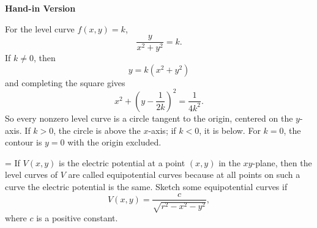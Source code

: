 \documentclass[a4paper,12pt,twocolumn]{article}
\newlength{\problemnumberwidth}
\newenvironment{solutionbox}{\begin{framed}}{\end{framed}}
\newcommand{\problem}[3]{%
  \Needspace{10\baselineskip}%
  \phantomsection\label{#1}%
  \par\vspace{0.8em}%
  \noindent
  \hangindent=\problemnumberwidth
  \hangafter=1
  \makebox[\problemnumberwidth][l]{\textbf{#2.}}#3\par
}
\begin{document}
\begin{solutionbox}
\textbf{Hand-in Version}

For the level curve \(f(x,y)=k\),
\[
\frac{y}{x^2+y^2}=k.
\]
If \(k\ne 0\), then
\[
y=k(x^2+y^2)
\]
and completing the square gives
\[
\boxed{x^2+\left(y-\frac{1}{2k}\right)^2=\frac{1}{4k^2}.}
\]
So every nonzero level curve is a circle tangent to the origin, centered on the \(y\)-axis. If \(k>0\), the circle is above the \(x\)-axis; if \(k<0\), it is below. For \(k=0\), the contour is \(y=0\) with the origin excluded.

\begin{center}
\end{center}
\end{solutionbox}

\problem{prob:14-1-56}{56}{If \(V(x,y)\) is the electric potential at a point \((x,y)\) in the \(xy\)-plane, then the level curves of \(V\) are called equipotential curves because at all points on such a curve the electric potential is the same. Sketch some equipotential curves if
\[
V(x,y)=\frac{c}{\sqrt{r^2-x^2-y^2}},
\]
where \(c\) is a positive constant.}
\end{document}
